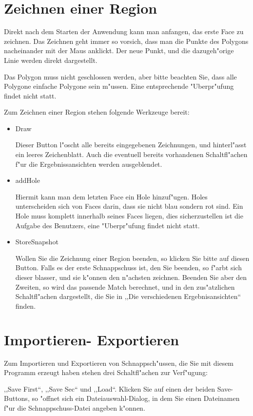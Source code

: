 \documentclass[a4paper,10pt,twoside]{scrreprt}
\begin{document}
\chapter{Zeichnen einer Region}
Direkt nach dem Starten der Anwendung kann man anfangen, das erste Face zu zeichnen.  Das Zeichnen geht immer so vorsich, dass man die Punkte des Polygons nacheinander mit der Maus anklickt. Der neue Punkt, und die dazugeh"orige Linie werden direkt dargestellt. 

Das Polygon muss nicht geschlossen werden, aber bitte beachten Sie, dass alle Polygone einfache Polygone sein m"ussen. Eine entsprechende "Uberpr"ufung findet nicht statt.

Zum Zeichnen einer Region stehen folgende Werkzeuge bereit:
\begin{itemize}
\item Draw

Dieser Button l"oscht alle bereits eingegebenen Zeichnungen, und hinterl"asst ein leeres Zeichenblatt. Auch die eventuell bereits vorhandenen Schaltfl"achen f"ur die Ergebnissansichten werden ausgeblendet.
\item addHole

Hiermit kann man dem letzten Face ein Hole hinzuf"ugen. Holes unterscheiden sich von Faces darin, dass sie nicht blau sondern rot sind. Ein Hole muss komplett innerhalb seines Faces liegen, dies sicherzustellen ist die Aufgabe des Benutzers, eine "Uberpr"ufung findet nicht statt.
\item StoreSnapshot

Wollen Sie die Zeichnung einer Region beenden, so klicken Sie bitte auf diesen Button. Falls es der erste Schnappschuss ist, den Sie beenden, so f"arbt sich dieser blasser, und sie k"onnen den n"achsten zeichnen. Beenden Sie aber den Zweiten, so wird das passende Match berechnet, und in den zus"atzlichen Schaltfl"achen dargestellt, die Sie in ,,Die verschiedenen Ergebnisansichten`` finden.
\end{itemize} 
\chapter{Importieren- Exportieren}
Zum Importieren und Exportieren von Schnappsch"ussen, die Sie mit diesem Programm erzeugt haben stehen drei Schaltfl"achen zur Verf"ugung:

,,Save First``, ,,Save Sec`` und ,,Load``. Klicken Sie auf einen der beiden Save-Buttons, so "offnet sich ein Dateiauswahl-Dialog, in dem Sie einen Dateinamen f"ur die Schnappschuss-Datei angeben k"onnen.
\end{document}
